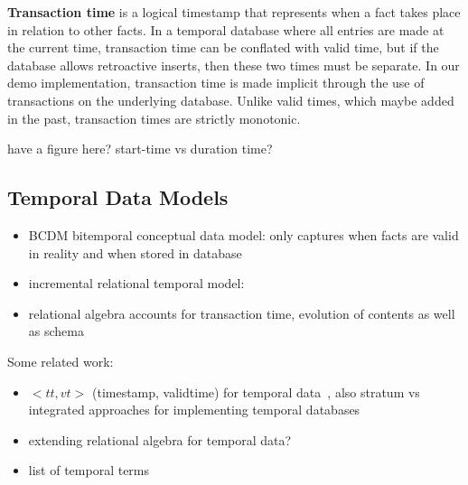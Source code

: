 \textbf{Transaction time} is a logical timestamp that represents when a fact
takes place in relation to other facts. In a temporal database where all
entries are made at the current time, transaction time can be conflated with
valid time, but if the database allows retroactive inserts, then these two
times must be separate. In our demo implementation, transaction time is made
implicit through the use of transactions on the underlying database. Unlike
valid times, which maybe added in the past, transaction times are strictly
monotonic.

have a figure here? start-time vs duration time?
\fi

\subsection{Temporal Data Models}

\begin{itemize}
\item BCDM bitemporal conceptual data model: only captures when facts are valid in reality and when stored in database~\cite{jensen1996semantics}\cite{jensen1994unifying}
\item incremental relational temporal model: \cite{jensen1991incremental}
\item relational algebra accounts for transaction time, evolution of contents as well as schema~\cite{mckenzie1990schema}
\end{itemize}


%
Some related work:
\begin{itemize}
\item $<tt, vt>$ (timestamp, validtime) for temporal data~\cite{jensen1999temporal},
also stratum vs integrated approaches for implementing temporal databases
\item extending relational algebra for temporal data?~\cite{lorentzos1988extending}
\item list of temporal terms~\cite{dyreson1994consensus}
\end{itemize}
